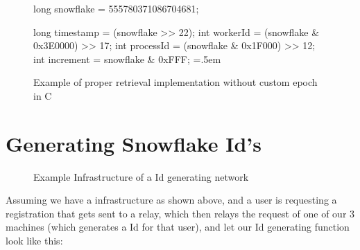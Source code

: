 \documentclass{article}
\newenvironment{lcverbatim}
{\SaveVerbatim{cverb}}
{\endSaveVerbatim{}
	\flushleft\fboxrule=0pt\fboxsep=.5em
	\colorbox{cverbbg}{%

		\makebox[\dimexpr\linewidth-2\fboxsep][l]{\BUseVerbatim{cverb}}%
	}
	\endflushleft{}
}
\begin{document}
\begin{figure}[H]
	\begin{lcverbatim}
	long snowflake = 555780371086704681;

	long timestamp = (snowflake >> 22);
	int workerId = (snowflake & 0x3E0000) >> 17;
	int processId = (snowflake & 0x1F000) >> 12;
	int increment = snowflake & 0xFFF;
	\end{lcverbatim}
	\caption{Example of proper retrieval implementation without custom
		epoch in
		C}\label{fig:r_complete2}
\end{figure}

\pagebreak

\section{Generating Snowflake Id's}

\begin{figure}[H]
	\centering

	\caption{Example Infrastructure of a Id generating
		network}\label{fig:ex_infrastructure}
\end{figure}

Assuming we have a infrastructure as shown above, and a user is requesting a
registration that gets sent to a relay, which then relays the request of one of
our 3 machines (which generates a Id for that user), and let our Id generating
function look like this:
\end{document}
